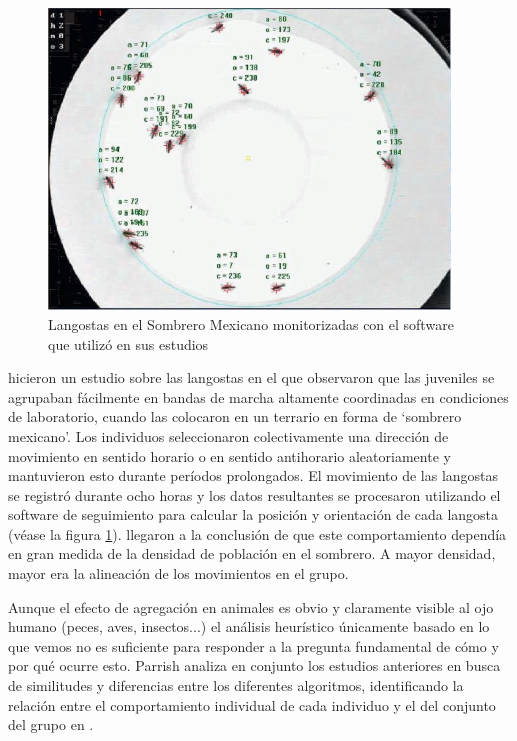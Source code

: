 \begin{figure}[!ht]
    \centering
    \includegraphics[height=8cm]{fig/cap02/Locusts.JPG}
    \caption{Langostas en el Sombrero Mexicano monitorizadas con el software que utilizó \citeauthor{buhl2006disorder} en sus estudios}
    \label{fig:locust_mexican_hat}
\end{figure}

\citeauthor{buhl2006disorder}\cite{buhl2006disorder} hicieron un estudio sobre las langostas en el que observaron que las juveniles se agrupaban fácilmente en bandas de marcha altamente coordinadas en condiciones de laboratorio, cuando las colocaron en un terrario en forma de `sombrero mexicano'. Los individuos seleccionaron colectivamente una dirección de movimiento en sentido horario o en sentido antihorario aleatoriamente y mantuvieron esto durante períodos prolongados. El movimiento de las langostas se registró durante ocho horas y los datos resultantes se procesaron utilizando el software de seguimiento para calcular la posición y orientación de cada langosta (véase la figura \ref{fig:locust_mexican_hat}). \citeauthor{buhl2006disorder} llegaron a la conclusión de que este comportamiento dependía en gran medida de la densidad de población en el sombrero. A mayor densidad, mayor era la alineación de los movimientos en el grupo.


Aunque el efecto de agregación en animales es obvio y claramente visible al ojo humano (peces, aves, insectos...) el análisis heurístico únicamente basado en lo que vemos no es suficiente para responder a la pregunta fundamental de cómo y por qué ocurre esto. Parrish analiza en conjunto los estudios anteriores en busca de similitudes y diferencias entre los diferentes algoritmos, identificando la relación entre el comportamiento individual de cada individuo y el del conjunto del grupo en \cite{parrish2002self}. 

